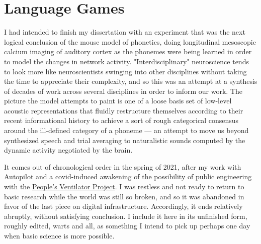 
\chapter*{Language Games}

I had intended to finish my dissertation with an experiment that was the next logical conclusion of the mouse model of phonetics, doing longitudinal mesoscopic calcium imaging of auditory cortex as the phonemes were being learned in order to model the changes in network activity. "Interdisciplinary" neuroscience tends to look more like neuroscientists swinging into other disciplines without taking the time to appreciate their complexity, and so this was an attempt at a synthesis of decades of work across several disciplines in order to inform our work. The picture the model attempts to paint is one of a loose basis set of low-level acoustic representations that fluidly restructure themselves according to their recent informational history to achieve a sort of rough categorical consensus around the ill-defined category of a phoneme --- an attempt to move us beyond synthesized speech and trial averaging to naturalistic sounds computed by the dynamic activity negotiated by the brain.

It comes out of chronological order in the spring of 2021, after my work with Autopilot and a covid-induced awakening of the possibility of public engineering with the \href{https://www.peoplesvent.org}{People's Ventilator Project}\citep{lachancePVP1PeopleVentilator2022}. I was restless and not ready to return to basic research while the world was still so broken, and so it was abandoned in favor of the last piece on digital infrastructure. Accordingly, it ends relatively abruptly, without satisfying conclusion. I include it here in its unfinished form, roughly edited, warts and all, as something I intend to pick up perhaps one day when basic science is more possible.